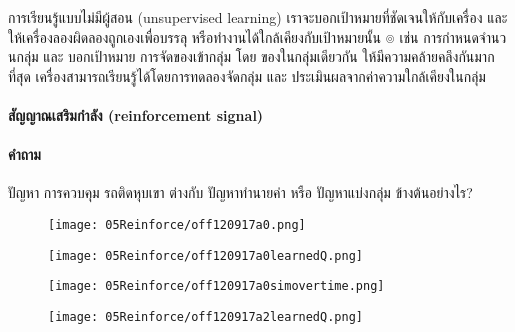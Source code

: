 การเรียนรู้แบบไม่มีผู้สอน (unsupervised learning)
เราจะบอกเป้าหมายที่ชัดเจนให้กับเครื่อง และ ให้เครื่องลองผิดลองถูกเองเพื่อบรรลุ หรือทำงานได้ใกล้เคียงกับเป้าหมายนั้น
๏ เช่น การกำหนดจำนวนกลุ่ม และ บอกเป้าหมาย การจัดของเข้ากลุ่ม โดย ของในกลุ่มเดียวกัน ให้มีความคล้ายคลึงกันมากที่สุด
%
เครื่องสามารถเรียนรู้ได้โดยการทดลองจัดกลุ่ม และ ประเมินผลจากค่าความใกล้เคียงในกลุ่ม
%








\paragraph{สัญญาณเสริมกำลัง (reinforcement signal)}

\paragraph{คำถาม} ปัญหา การควบคุม รถติดหุบเขา ต่างกับ ปัญหาทำนายค่า หรือ ปัญหาแบ่งกลุ่ม ข้างต้นอย่างไร?



%
\begin{figure}
\begin{center}
\texttt{[image: 05Reinforce/off120917a0.png]}
\end{center}
\end{figure}
%

%
\begin{figure}
\begin{center}
\texttt{[image: 05Reinforce/off120917a0learnedQ.png]}
\end{center}
\end{figure}
%

%
\begin{figure}
\begin{center}
\texttt{[image: 05Reinforce/off120917a0simovertime.png]}
\end{center}
\end{figure}
%

%
\begin{figure}
\begin{center}
\texttt{[image: 05Reinforce/off120917a2learnedQ.png]}
\end{center}
\label{fig: mtncar learned Q}
\end{figure}
%

